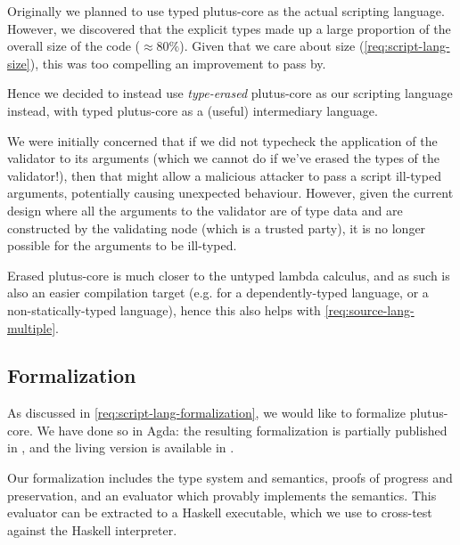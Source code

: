 Originally we planned to use typed \gls{plutus-core} as the actual scripting language.
However, we discovered that the explicit types made up a large proportion of the overall size of the code ($\approx 80\%$).
Given that we care about size (\cref{req:script-lang-size}), this was too compelling an improvement to pass by.

Hence we decided to instead use \emph{type-erased} \gls{plutus-core} as our scripting language instead, with typed \gls{plutus-core} as a (useful) intermediary language.

We were initially concerned that if we did not typecheck the application of the \gls{validator} to its arguments (which we cannot do if we've erased the types of the \gls{validator}!), then that might allow a malicious attacker to pass a script ill-typed arguments, potentially causing unexpected behaviour.
However, given the current design where all the arguments to the \gls{validator} are of type \gls{data} and are constructed by the validating node (which is a trusted party), it is no longer possible for the arguments to be ill-typed.

Erased \gls{plutus-core} is much closer to the untyped lambda calculus, and as such is also an easier compilation target (e.g. for a dependently-typed language, or a non-statically-typed language), hence this also helps with \cref{req:source-lang-multiple}.

\subsection{Formalization}

As discussed in \cref{req:script-lang-formalization}, we would like to formalize \gls{plutus-core}.
We have done so in Agda: the resulting formalization is partially published in \textcite{chapman2019system}, and the living version is available in \textcite{plutus-repo}.

Our formalization includes the type system and semantics, proofs of progress and preservation, and an evaluator which provably implements the semantics.
This evaluator can be extracted to a Haskell executable, which we use to cross-test against the Haskell interpreter.
